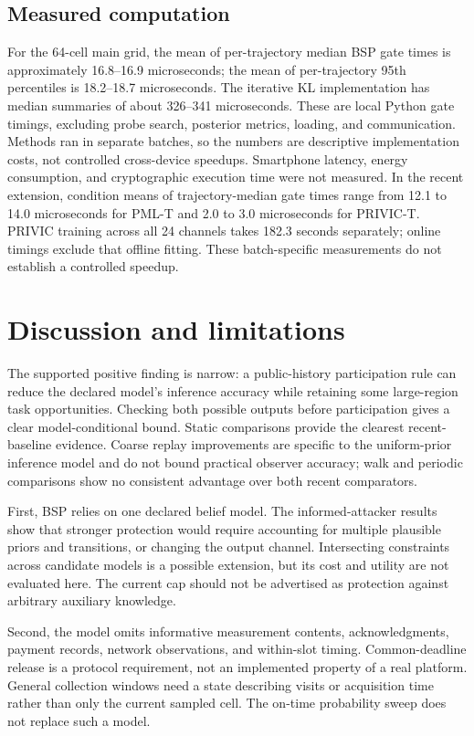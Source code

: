 \documentclass[3p,times]{elsarticle}
\begin{document}
\subsection{Measured computation}
For the 64-cell main grid, the mean of per-trajectory median BSP gate times is approximately 16.8--16.9 microseconds; the mean of per-trajectory 95th percentiles is 18.2--18.7 microseconds. The iterative KL implementation has median summaries of about 326--341 microseconds. These are local Python gate timings, excluding probe search, posterior metrics, loading, and communication. Methods ran in separate batches, so the numbers are descriptive implementation costs, not controlled cross-device speedups. Smartphone latency, energy consumption, and cryptographic execution time were not measured. In the recent extension, condition means of trajectory-median gate times range from 12.1 to 14.0 microseconds for PML-T and 2.0 to 3.0 microseconds for PRIVIC-T. PRIVIC training across all 24 channels takes 182.3 seconds separately; online timings exclude that offline fitting. These batch-specific measurements do not establish a controlled speedup.

\section{Discussion and limitations}
The supported positive finding is narrow: a public-history participation rule can reduce the declared model's inference accuracy while retaining some large-region task opportunities. Checking both possible outputs before participation gives a clear model-conditional bound. Static comparisons provide the clearest recent-baseline evidence. Coarse replay improvements are specific to the uniform-prior inference model and do not bound practical observer accuracy; walk and periodic comparisons show no consistent advantage over both recent comparators.

First, BSP relies on one declared belief model. The informed-attacker results show that stronger protection would require accounting for multiple plausible priors and transitions, or changing the output channel. Intersecting constraints across candidate models is a possible extension, but its cost and utility are not evaluated here. The current cap should not be advertised as protection against arbitrary auxiliary knowledge.

Second, the model omits informative measurement contents, acknowledgments, payment records, network observations, and within-slot timing. Common-deadline release is a protocol requirement, not an implemented property of a real platform. General collection windows need a state describing visits or acquisition time rather than only the current sampled cell. The on-time probability sweep does not replace such a model.
\end{document}
